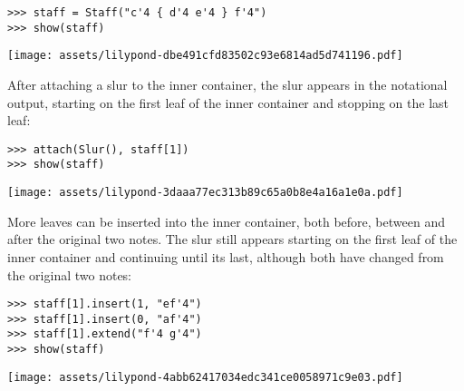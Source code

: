 \begin{comment}
<abjad>
staff = Staff("c'4 { d'4 e'4 } f'4")
show(staff)
</abjad>
\end{comment}

\begin{abjadbookoutput}
\begin{singlespacing}
\vspace{-0.5\baselineskip}
\begin{verbatim}
>>> staff = Staff("c'4 { d'4 e'4 } f'4")
>>> show(staff)
\end{verbatim}
\noindent\texttt{[image: assets/lilypond-dbe491cfd83502c93e6814ad5d741196.pdf]}
\end{singlespacing}
\end{abjadbookoutput}

\noindent After attaching a slur to the inner container, the slur appears in
the notational output, starting on the first leaf of the inner container and
stopping on the last leaf:

\begin{comment}
<abjad>
attach(Slur(), staff[1])
show(staff)
</abjad>
\end{comment}

\begin{abjadbookoutput}
\begin{singlespacing}
\vspace{-0.5\baselineskip}
\begin{verbatim}
>>> attach(Slur(), staff[1])
>>> show(staff)
\end{verbatim}
\noindent\texttt{[image: assets/lilypond-3daaa77ec313b89c65a0b8e4a16a1e0a.pdf]}
\end{singlespacing}
\end{abjadbookoutput}

\noindent More leaves can be inserted into the inner container, both before,
between and after the original two notes. The slur still appears starting on
the first leaf of the inner container and continuing until its last, although
both have changed from the original two notes:

\begin{comment}
<abjad>
staff[1].insert(1, "ef'4")
staff[1].insert(0, "af'4")
staff[1].extend("f'4 g'4")
show(staff)
</abjad>
\end{comment}

\begin{abjadbookoutput}
\begin{singlespacing}
\vspace{-0.5\baselineskip}
\begin{verbatim}
>>> staff[1].insert(1, "ef'4")
>>> staff[1].insert(0, "af'4")
>>> staff[1].extend("f'4 g'4")
>>> show(staff)
\end{verbatim}
\noindent\texttt{[image: assets/lilypond-4abb62417034edc341ce0058971c9e03.pdf]}
\end{singlespacing}
\end{abjadbookoutput}

